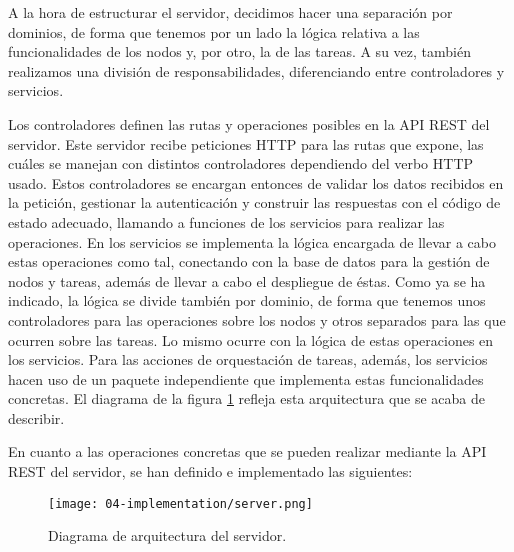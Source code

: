 A la hora de estructurar el servidor, decidimos hacer una separación por
dominios, de forma que tenemos por un lado la lógica relativa a las
funcionalidades de los nodos y, por otro, la de las tareas. A su vez, también
realizamos una división de responsabilidades, diferenciando entre controladores
y servicios.

Los controladores definen las rutas y operaciones posibles en la API REST del
servidor. Este servidor recibe peticiones HTTP para las rutas que expone, las
cuáles se manejan con distintos controladores dependiendo del verbo HTTP usado.
Estos controladores se encargan entonces de validar los datos recibidos en la
petición, gestionar la autenticación y construir las respuestas con el código de
estado adecuado, llamando a funciones de los servicios para realizar las
operaciones. En los servicios se implementa la lógica encargada de llevar a cabo
estas operaciones como tal, conectando con la base de datos para la gestión de
nodos y tareas, además de llevar a cabo el despliegue de éstas. Como ya se ha
indicado, la lógica se divide también por dominio, de forma que tenemos unos
controladores para las operaciones sobre los nodos y otros separados para las
que ocurren sobre las tareas. Lo mismo ocurre con la lógica de estas operaciones
en los servicios. Para las acciones de orquestación de tareas, además, los
servicios hacen uso de un paquete independiente que implementa estas
funcionalidades concretas. El diagrama de la figura
\ref{fig:04-server_architecture} refleja esta arquitectura que se acaba de
describir.

En cuanto a las operaciones concretas que se pueden realizar mediante la API
REST del servidor, se han definido e implementado las siguientes:

\begin{figure}
    \centering
    \texttt{[image: 04-implementation/server.png]}
    \caption{Diagrama de arquitectura del servidor.}
    \label{fig:04-server_architecture}
\end{figure}

